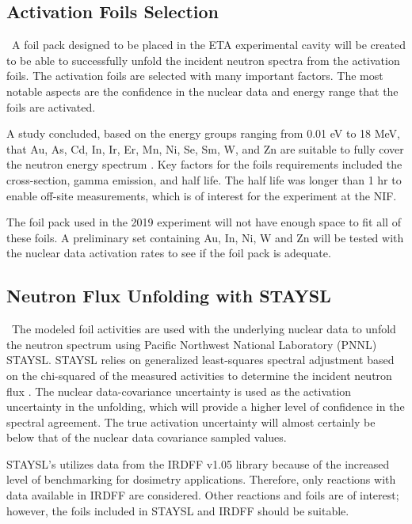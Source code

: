 \subsection{Activation Foils Selection}

\ A foil pack designed to be placed in the ETA experimental cavity will be created to be able to successfully unfold the incident neutron spectra from the activation foils. 
The activation foils are selected with many important factors. 
The most notable aspects are the confidence in the nuclear data and energy range that the foils are activated. 

A study concluded, based on the energy groups ranging from 0.01 eV to 18 MeV, 
that Au, As, Cd, In, Ir, Er, Mn, Ni, Se, Sm, W, and Zn are suitable to fully 
cover the neutron energy spectrum \cite{Vagena2018b}. 
Key factors for the foils requirements included the cross-section, gamma emission, and half life. 
The half life was longer than 1 hr to enable off-site measurements, which is of interest for the experiment at the NIF. 

The foil pack used in the 2019 experiment will not have enough space to fit all of these foils. 
A preliminary set containing Au, In, Ni, W and Zn will be tested with the nuclear data activation rates to see if the foil pack is adequate. %

\subsection{Neutron Flux Unfolding with STAYSL}

\ The modeled foil activities are used with the underlying nuclear data to unfold the neutron spectrum using Pacific Northwest National Laboratory (PNNL) STAYSL. 
STAYSL relies on generalized least-squares spectral adjustment based on the chi-squared of the measured activities to determine the incident neutron flux \cite{Greenwood2016}. 
The nuclear data-covariance uncertainty is used as the activation uncertainty in the unfolding, which will provide a higher level of confidence in the spectral agreement. 
The true activation uncertainty will almost certainly be below that of the nuclear data covariance sampled values.

STAYSL's utilizes data from the IRDFF v1.05 library because of the increased level of benchmarking for dosimetry applications. 
Therefore, only reactions with data available in IRDFF are considered. 
Other reactions and foils are of interest; however, the foils included in STAYSL and IRDFF should be suitable. 


